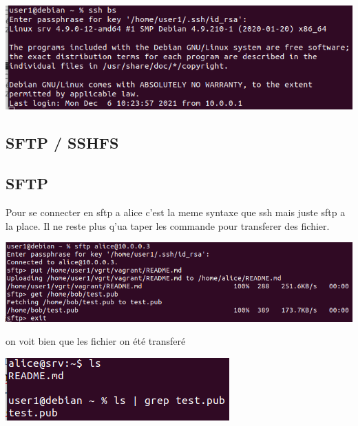 \documentclass{article}
\begin{document}
 \begin{center}
        \includegraphics[scale=0.47]{Images/bsresult.png}
 \end{center}
 
 
 
 \subsection{\large{SFTP / SSHFS}}
 
 \subsection*{\normalsize{SFTP} } 
 
 Pour se connecter en sftp a alice c'est la meme syntaxe que ssh mais juste sftp a la place. Il ne reste plus q'ua taper les commande pour transferer des fichier.
 
 \begin{center}
        \includegraphics[scale=0.47]{Images/sftp.png}
 \end{center}
 
  \newpage
  
 on voit bien que les fichier on été transferé
 
 \begin{center}
        \includegraphics[scale=0.5]{Images/sftpresult.png}
 \end{center}
 
\end{document}
